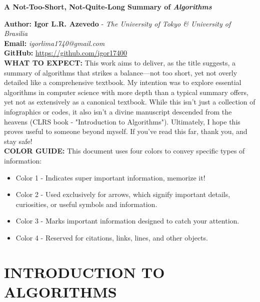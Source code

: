 \documentclass[a4paper,10pt]{article}
\begin{document}
\noindent 
\begin{center}
\textbf{{\LARGE A Not-Too-Short, Not-Quite-Long Summary of \textit{Algorithms}}} 
\end{center}
\vspace{1cm}

\noindent 
\textbf{Author: Igor L.R. Azevedo} - \textit{The University of Tokyo \& University of Brasilia}
\\
\textbf{Email:} \textit{igorlima1740@gmail.com}
\\
\textbf{GitHub:} \url{https://github.com/igor17400}
\\


\noindent 
\textbf{WHAT TO EXPECT: } This work aims to deliver, as the title suggests, a summary of algorithms that strikes a balance—not too short, yet not overly detailed like a comprehensive textbook. My intention was to explore essential algorithms in computer science with more depth than a typical summary offers, yet not as extensively as a canonical textbook. While this isn't just a collection of infographics or codes, it also isn't a divine manuscript descended from the heavens (CLRS book - "Introduction to Algorithms"). Ultimately, I hope this proves useful to someone beyond myself. If you've read this far, thank you, and stay safe!
\\

\noindent
\textbf{COLOR GUIDE:} This document uses four colors to convey specific types of information:
\begin{itemize}
    \item \colorbox{color1}{Color 1} - Indicates super important information, memorize it!
    \item \colorbox{color2}{Color 2} - Used exclusively for arrows, which signify important details, curiosities, or useful symbols and information.
    \item \colorbox{color3}{Color 3} - Marks important information designed to catch your attention.
    \item \colorbox{color4}{Color 4} - Reserved for citations, links, lines, and other objects.
\end{itemize}

\tableofcontents

\section{INTRODUCTION TO ALGORITHMS}
\end{document}
